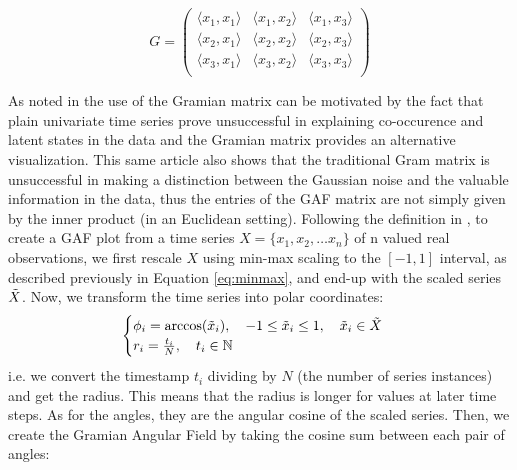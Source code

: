 \documentclass[12pt, a4paper]{article}
\begin{document}
$$
G =\begin{pmatrix} 
\langle x_1,x_1 \rangle & \langle x_1,x_2 \rangle & \langle x_1,x_3 \rangle \\
\langle x_2,x_1 \rangle & \langle x_2,x_2 \rangle & \langle x_2,x_3 \rangle \\
\langle x_3,x_1 \rangle & \langle x_3,x_2 \rangle & \langle x_3,x_3 \rangle \\
\end{pmatrix}
$$

As noted in \cite{gaf_medium} the use of the Gramian matrix can be motivated by the fact that plain univariate time series prove unsuccessful in explaining co-occurence and latent states in the data and the Gramian matrix provides an alternative visualization. This same article also shows that the traditional Gram matrix is unsuccessful in making a distinction between the Gaussian noise and the valuable information in the data, thus the entries of the GAF matrix are not simply given by the inner product (in an Euclidean setting). Following the definition in \cite{wang2015encoding}, to create a GAF plot from a time series $X = \{x_1,x_2, \dots x_n\}$ of n valued real observations, we first rescale $X$ using min-max scaling to the $[-1,1]$ interval, as described previously in Equation \ref{eq:minmax}, and end-up with the scaled series $\Tilde{X}$. Now, we transform the time series into polar coordinates:
\begin{align}
\label{eq:gafencode}
    \begin{cases}
        \phi_i = \arccos(\Tilde{x}_i), \quad -1 \leq \Tilde{x}_i \leq 1, \quad \Tilde{x}_i \in \Tilde{X}\\
        r_i = \frac{t_i}{N}, \quad t_i \in \mathbb{N}
    \end{cases}
\end{align}
i.e. we convert the timestamp $t_i$ dividing by $N$ (the number of series instances) and get the radius. This means that the radius is longer for values at later time steps. As for the angles, they are the angular cosine of the scaled series. Then, we create the Gramian Angular Field by taking the cosine sum between each pair of angles:
\end{document}
